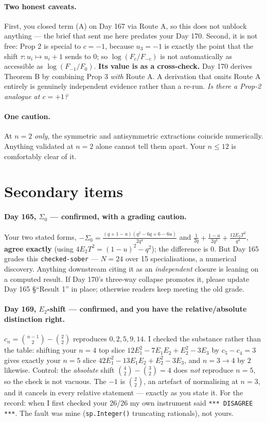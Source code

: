\documentclass[11pt]{article}
\theoremstyle{definition}
\begin{document}
\paragraph{Two honest caveats.} First, you closed term (A) on Day 167 via Route A, so this
does not unblock anything --- the brief that sent me here predates your Day 170.
Second, it is not free: Prop 2 is special to $c=-1$, because $u_3=-1$ is exactly the point
that the shift $\tau:u_i\mapsto u_i+1$ sends to $0$; so $\log(F_c/F_{-c})$ is not
automatically as accessible as $\log(F_{-1}/F_0)$.
\textbf{Its value is as a cross-check.} Day 170 derives Theorem B by combining Prop 3
\emph{with} Route A. A derivation that omits Route A entirely is genuinely independent
evidence rather than a re-run. \emph{Is there a Prop-2 analogue at $c=+1$?}

\paragraph{One caution.} At $n=2$ \emph{only}, the symmetric and antisymmetric extractions
coincide numerically. Anything validated at $n=2$ alone cannot tell them apart. Your
$n\le12$ is comfortably clear of it.

\section{Secondary items}

\paragraph{Day 165, $\Sigma_0$ --- confirmed, with a grading caution.}
Your two stated forms,
$-\Sigma_0=\frac{(q+1-u)(q^2-6q+6-6u)}{2q^4}$ and
$\frac1{2q}+\frac{1-u}{2q^2}+\frac{12E_2T^2}{q^4}$, \textbf{agree exactly}
(using $4E_2T^2=(1-u)^2-q^2$); the difference is $0$. But Day 165 grades this
\texttt{checked-sober} --- $N=24$ over 15 specialisations, a numerical discovery.
Anything downstream citing it as an \emph{independent} closure is leaning on a computed
result. If Day 170's three-way collapse promotes it, please update Day 165 \S``Result 1''
in place; otherwise readers keep meeting the old grade.

\paragraph{Day 169, $E_2$-shift --- confirmed, and you have the relative/absolute
distinction right.} $c_n=\binom{n-1}{2}-\binom{2}{2}$ reproduces $0,2,5,9,14$. I checked
the substance rather than the table: shifting your $n=4$ top slice
$12E_1^2-7E_1E_2+E_2^2-3E_3$ by $c_5-c_4=3$ gives exactly your $n=5$ slice
$42E_1^2-13E_1E_2+E_2^2-3E_3$, and $n=3\to4$ by $2$ likewise. Control: the
\emph{absolute} shift $\binom42-\binom32=4$ does \emph{not} reproduce $n=5$, so the check
is not vacuous. The $-1$ is $\binom22$, an artefact of normalising at $n=3$, and it
cancels in every relative statement --- exactly as you state it. For the record: when I
first checked your 26/26 my own instrument said \texttt{*** DISAGREE ***}. The fault was
mine (\texttt{sp.Integer()} truncating rationals), not yours.
\end{document}
